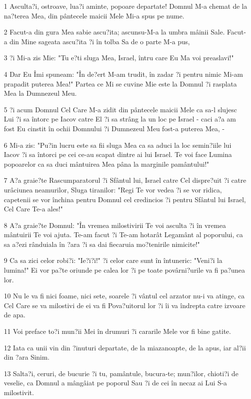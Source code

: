 \par 1 Asculta?i, ostroave, lua?i aminte, popoare departate! Domnul M-a chemat de la na?terea Mea, din pântecele maicii Mele Mi-a spus pe nume.
\par 2 Facut-a din gura Mea sabie ascu?ita; ascunsu-M-a la umbra mâinii Sale. Facut-a din Mine sageata ascu?ita ?i în tolba Sa de o parte M-a pus,
\par 3 ?i Mi-a zis Mie: "Tu e?ti sluga Mea, Israel, întru care Eu Ma voi preaslavi!"
\par 4 Dar Eu Îmi spuneam: "În de?ert M-am trudit, în zadar ?i pentru nimic Mi-am prapadit puterea Mea!" Partea ce Mi se cuvine Mie este la Domnul ?i rasplata Mea la Dumnezeul Meu.
\par 5 ?i acum Domnul Cel Care M-a zidit din pântecele maicii Mele ca sa-l slujesc Lui ?i sa întorc pe Iacov catre El ?i sa strâng la un loc pe Israel - caci a?a am fost Eu cinstit în ochii Domnului ?i Dumnezeul Meu fost-a puterea Mea, -
\par 6 Mi-a zis: "Pu?in lucru este sa fii sluga Mea ca sa aduci la loc semin?iile lui Iacov ?i sa întorci pe cei ce-au scapat dintre ai lui Israel. Te voi face Lumina popoarelor ca sa duci mântuirea Mea pâna la marginile pamântului!"
\par 7 A?a graie?te Rascumparatorul ?i Sfântul lui, Israel catre Cel dispre?uit ?i catre urâciunea neamurilor, Sluga tiranilor: "Regi Te vor vedea ?i se vor ridica, capetenii se vor închina pentru Domnul cel credincios ?i pentru Sfântul lui Israel, Cel Care Te-a ales!"
\par 8 A?a graie?te Domnul: "În vremea milostivirii Te voi asculta ?i în vremea mântuirii Te voi ajuta. Te-am facut ?i Te-am hotarât Legamânt al poporului, ca sa a?ezi rânduiala în ?ara ?i sa dai fiecaruia mo?tenirile nimicite!"
\par 9 Ca sa zici celor robi?i: "Ie?i?i!" ?i celor care sunt în întuneric: "Veni?i la lumina!" Ei vor pa?te oriunde pe calea lor ?i pe toate povârni?urile va fi pa?unea lor.
\par 10 Nu le va fi nici foame, nici sete, soarele ?i vântul cel arzator nu-i va atinge, ca Cel Care se va milostivi de ei va fi Pova?uitorul lor ?i îi va îndrepta catre izvoare de apa.
\par 11 Voi preface to?i mun?ii Mei în drumuri ?i cararile Mele vor fi bine gatite.
\par 12 Iata ca unii vin din ?inuturi departate, de la miazanoapte, de la apus, iar al?ii din ?ara Sinim.
\par 13 Salta?i, ceruri, de bucurie ?i tu, pamântule, bucura-te; mun?ilor, chioti?i de veselie, ca Domnul a mângâiat pe poporul Sau ?i de cei în necaz ai Lui S-a milostivit.
